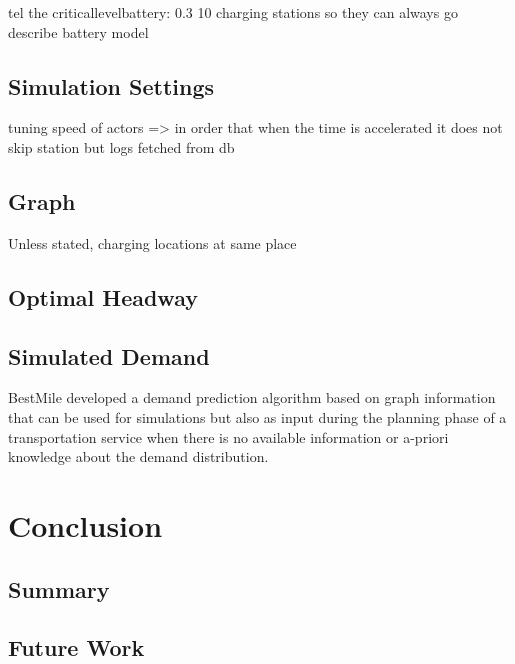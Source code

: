 \documentclass[12pt,a4paper]{article}
\begin{document}
tel the criticallevelbattery: 0.3
10 charging stations so they can always go
describe battery model



\subsection{Simulation Settings}
tuning
speed of actors
=> in order that when the time is accelerated it does not skip station but
logs fetched from db

\subsection{Graph}
Unless stated, charging locations at same place
\subsection{Optimal Headway}
\subsection{Simulated Demand}
BestMile developed a demand prediction algorithm based on graph information that can be used for simulations but also as input during the planning phase of a transportation service when there is no available information or a-priori knowledge about the demand distribution. 
\section{Conclusion}\label{conclusion}
\subsection{Summary}\label{summary}
\subsection{Future Work}\label{futurework}



\end{document}
